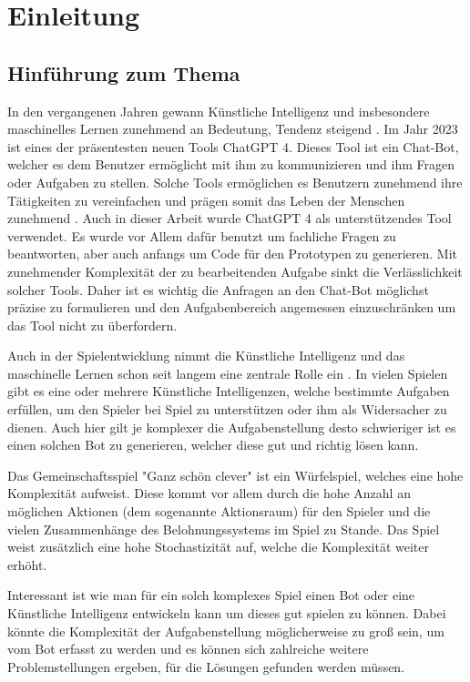 \section{Einleitung}
\subsection{Hinführung zum Thema}
In den vergangenen Jahren gewann Künstliche Intelligenz und insbesondere maschinelles Lernen zunehmend an Bedeutung, Tendenz steigend \cite{noauthor_kunstliche_nodate,noauthor_maschinelles_2023}. Im Jahr 2023 ist eines der präsentesten neuen Tools ChatGPT 4. Dieses Tool ist ein Chat-Bot, welcher es dem Benutzer ermöglicht mit ihm zu kommunizieren und ihm Fragen oder Aufgaben zu stellen. Solche Tools ermöglichen es Benutzern zunehmend ihre Tätigkeiten zu vereinfachen und prägen somit das Leben der Menschen zunehmend \cite{tagesschaude_chatgpt_nodate}. Auch in dieser Arbeit wurde ChatGPT 4 als unterstützendes Tool verwendet. Es wurde vor Allem dafür benutzt um fachliche Fragen zu beantworten, aber auch anfangs um Code für den Prototypen zu generieren. Mit zunehmender Komplexität der zu bearbeitenden Aufgabe sinkt die Verlässlichkeit solcher Tools. Daher ist es wichtig die Anfragen an den Chat-Bot möglichst präzise zu formulieren und den Aufgabenbereich angemessen einzuschränken um das Tool nicht zu überfordern.

Auch in der Spielentwicklung nimmt die Künstliche Intelligenz und das maschinelle Lernen schon seit langem eine zentrale Rolle ein \cite{noauthor_kunstliche_2023}. In vielen Spielen gibt es eine oder mehrere Künstliche Intelligenzen, welche bestimmte Aufgaben erfüllen, um den Spieler bei Spiel zu unterstützen oder ihm als Widersacher zu dienen. Auch hier gilt je komplexer die Aufgabenstellung desto schwieriger ist es einen solchen Bot zu generieren, welcher diese gut und richtig lösen kann.

Das Gemeinschaftsspiel "Ganz schön clever" ist ein Würfelspiel, welches eine hohe Komplexität aufweist. Diese kommt vor allem durch die hohe Anzahl an möglichen Aktionen (dem sogenannte Aktionsraum) für den Spieler und die vielen Zusammenhänge des Belohnungssystems im Spiel zu Stande. Das Spiel weist zusätzlich eine hohe Stochastizität auf, welche die Komplexität weiter erhöht.

Interessant ist wie man für ein solch komplexes Spiel einen Bot oder eine Künstliche Intelligenz entwickeln kann um dieses gut spielen zu können. Dabei könnte die Komplexität der Aufgabenstellung möglicherweise zu groß sein, um vom Bot erfasst zu werden und es können sich zahlreiche weitere Problemstellungen ergeben, für die Lösungen gefunden werden müssen.
